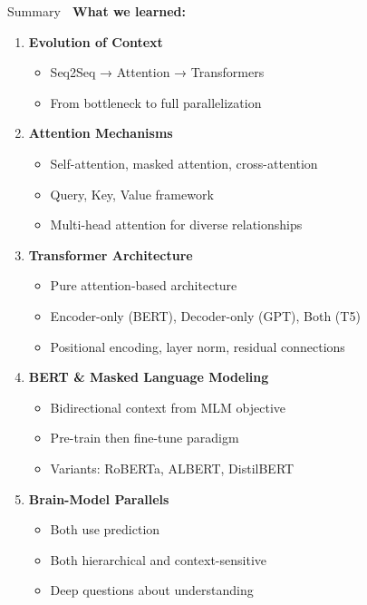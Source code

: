 \documentclass[aspectratio=169]{beamer}
\begin{document}
\begin{frame}[shrink=10]{Summary 🎯}
\textbf{What we learned:}

\begin{enumerate}\setlength{\itemsep}{0pt}
    \item \textbf{Evolution of Context}
    \begin{itemize}\setlength{\itemsep}{0pt}
        \item Seq2Seq → Attention → Transformers
        \item From bottleneck to full parallelization
    \end{itemize}

    \item \textbf{Attention Mechanisms}
    \begin{itemize}\setlength{\itemsep}{0pt}
        \item Self-attention, masked attention, cross-attention
        \item Query, Key, Value framework
        \item Multi-head attention for diverse relationships
    \end{itemize}

    \item \textbf{Transformer Architecture}
    \begin{itemize}\setlength{\itemsep}{0pt}
        \item Pure attention-based architecture
        \item Encoder-only (BERT), Decoder-only (GPT), Both (T5)
        \item Positional encoding, layer norm, residual connections
    \end{itemize}

    \item \textbf{BERT \& Masked Language Modeling}
    \begin{itemize}\setlength{\itemsep}{0pt}
        \item Bidirectional context from MLM objective
        \item Pre-train then fine-tune paradigm
        \item Variants: RoBERTa, ALBERT, DistilBERT
    \end{itemize}

    \item \textbf{Brain-Model Parallels}
    \begin{itemize}\setlength{\itemsep}{0pt}
        \item Both use prediction
        \item Both hierarchical and context-sensitive
        \item Deep questions about understanding
    \end{itemize}
\end{enumerate}
\end{frame}
\end{document}
